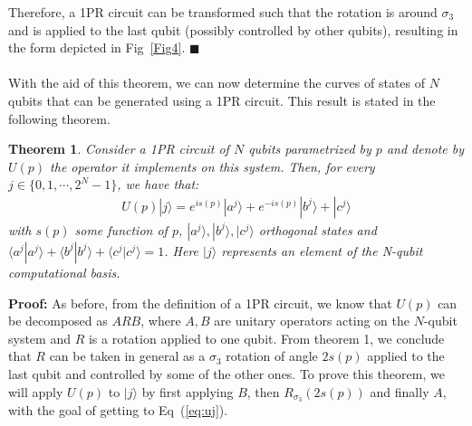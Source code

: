 \documentclass[10pt,letterpaper]{article} %
\newcommand{\fref}[1]{Fig~\ref{#1}}
\newcommand{\eref}[1]{Eq~(\ref{#1})}
\newtheorem{theorem}{Theorem}
\begin{document}
Therefore, a 1PR circuit can be transformed such
that the rotation is around $\sigma_3$ and is applied to the last qubit 
(possibly controlled by other qubits), 
resulting in the form depicted in \fref{Fig4}. 
$\blacksquare$ \\
$\;$\\

With the aid of this theorem, we can now determine the curves
of states of $N$ qubits that can be generated using a 1PR circuit. 
This result is stated in the following theorem.

\begin{theorem}
\label{theorem2}
Consider a 1PR circuit of $N$ qubits parametrized by $p$
and denote by $U(p)$ the operator it implements on this system. 
Then, for every $j \in \{0, 1, \cdots, 2^N-1\}$, 
we have that:
\begin{align}
U(p)|j\rangle = e^{is(p)} |a^j\rangle + e^{-is(p)} |b^j\rangle + |c^j\rangle
\label{eq:uj}
\end{align}
with $s(p)$ some function of $p$,  $|a^j\rangle ,|b^j\rangle, |c^j\rangle$ orthogonal states 
and $\langle a^j| a^j\rangle + \langle b^j| b^j\rangle + \langle
c^j|c^j \rangle = 1$. Here $|j\rangle$ represents an element of the N-qubit  computational basis.
\end{theorem}
\textbf{Proof:}  
As before, from the definition of a 1PR circuit, we know that $U(p)$ can be
decomposed as $ARB$, where $A,B$ are unitary operators acting on the $N$-qubit
system and $R$ is a rotation applied to one qubit.  From theorem 1, we conclude
that $R$ can be taken in general as a $\sigma_3$ rotation of angle $2s(p)$
applied to the last qubit and controlled by some of the other ones.  To prove
this theorem, we will apply $U(p)$ to $|j\rangle$ by first applying $B$, then
$R_{\sigma_3}(2s(p))$ and finally $A$, with the goal of getting to
\eref{eq:uj}. 
\end{document}

